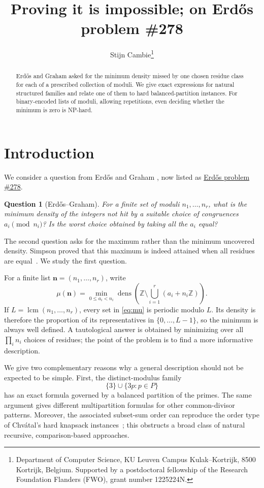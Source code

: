 \documentclass[a4paper,11pt]{article}
\author{Stijn Cambie\thanks{Department of Computer Science, KU Leuven Campus Kulak--Kortrijk,
8500 Kortrijk, Belgium. Supported by a postdoctoral fellowship of the Research Foundation
Flanders (FWO), grant number 1225224N.}}
\title{Proving it is impossible; on Erd\H{o}s problem \#278}
\newtheorem{question}{Question}
\newcommand{\Z}{\mathbb Z}
\newcommand{\dens}{\operatorname{dens}}
\newcommand{\lcmop}{\operatorname{lcm}}
\begin{document}
\maketitle

\begin{abstract}
Erd\H{o}s and Graham asked for the minimum density missed by one chosen
residue class for each of a prescribed collection of moduli.  We give exact
expressions for natural structured families and relate one of them to hard
balanced-partition instances.  For binary-encoded lists of moduli, allowing
repetitions, even deciding whether the minimum is zero is NP-hard.
\end{abstract}

\section{Introduction}

We consider a question from Erd\H{o}s and Graham
\cite[p.~28, lines 4--6]{ErGr80}, now listed as
\href{https://www.erdosproblems.com/278}{Erd\H{o}s problem \#278}.

\begin{question}[Erd\H{o}s--Graham]
For a finite set of moduli $n_1,\ldots,n_r$, what is the minimum density of
the integers not hit by a suitable choice of congruences
$a_i\pmod {n_i}$?  Is the worst choice obtained by taking all the $a_i$
equal?
\end{question}

The second question asks for the maximum rather than the minimum uncovered
density.  Simpson proved that this maximum is indeed attained when all
residues are equal~\cite[Lemma~2.3]{Simpson86}.  We study the first question.

For a finite list $\mathbf n=(n_1,\ldots,n_r)$, write
\begin{equation}\label{eq:mu}
 \mu(\mathbf n)=
 \min_{0\leq a_i<n_i}
 \dens\!\left(\Z\setminus\bigcup_{i=1}^r(a_i+n_i\Z)\right).
\end{equation}
If $L=\lcmop(n_1,\ldots,n_r)$, every set in \eqref{eq:mu} is periodic
modulo $L$.  Its density is therefore the proportion of its representatives
in $\{0,\ldots,L-1\}$, so the minimum is always well defined.  A tautological
answer is obtained by minimizing over all $\prod_i n_i$ choices of residues;
the point of the problem is to find a more informative description.

We give two complementary reasons why a general description should not be
expected to be simple.  First, the distinct-modulus family
\[
 \{3\}\cup\{3p:p\in P\}
\]
has an exact formula governed by a balanced partition of the primes.  The
same argument gives different multipartition formulas for other common-divisor
patterns.  Moreover, the associated subset-sum order can reproduce the order
type of Chv\'atal's hard knapsack instances~\cite{Chvatal80}; this obstructs a broad class
of natural recursive, comparison-based approaches.
\end{document}
